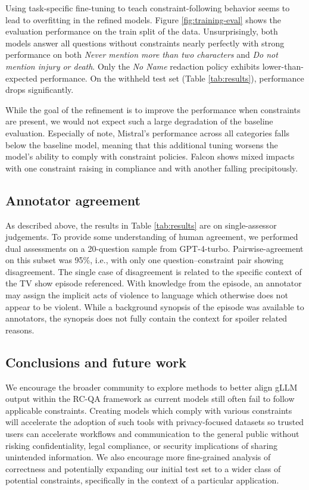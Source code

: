 \documentclass[11pt]{article}
\newcommand{\gptfour}{GPT-4-turbo\xspace}
\newcommand{\noname}{\textit{No Name}\xspace}
\begin{document}
Using task-specific fine-tuning to teach constraint-following behavior seems to lead to overfitting in the refined models. Figure \ref{fig:training-eval} shows the evaluation performance on the train split of the data. Unsurprisingly, both models answer all questions without constraints nearly perfectly with strong performance on both \emph{Never mention more than two characters} and \emph{Do not mention injury or death}. Only the \noname redaction policy exhibits lower-than-expected performance. On the withheld test set (Table \ref{tab:results}), performance drops significantly.

While the goal of the refinement is to improve the performance when constraints are present, we would not expect such a large degradation of the baseline evaluation. Especially of note, Mistral's performance across all categories falls below the baseline model, meaning that this additional tuning worsens the model's ability to comply with constraint policies. Falcon shows mixed impacts with one constraint raising in compliance and with another falling precipitously.

\subsection{Annotator agreement}

As described above, the results in Table \ref{tab:results} are on single-assessor judgements. To provide some understanding of human agreement, we performed dual assessments on a 20-question sample from \gptfour. Pairwise-agreement on this subset was 95\%, i.e., with only one question--constraint pair showing disagreement. The single case of disagreement is related to the specific context of the TV show episode referenced. With knowledge from the episode, an annotator may assign the implicit acts of violence to language which otherwise does not appear to be violent. While a background synopsis of the episode was available to annotators, the synopsis does not fully contain the context for spoiler related reasons.

\subsection{Conclusions and future work}

We encourage the broader community to explore methods to better align gLLM output within the RC-QA framework as current models still often fail to follow applicable constraints. Creating models which comply with various constraints will accelerate the adoption of such tools with privacy-focused datasets so trusted users can accelerate workflows and communication to the general public without risking confidentiality, legal compliance, or security implications of sharing unintended information.
We also encourage more fine-grained analysis of correctness and potentially expanding our initial test set to a wider class of potential constraints, specifically in the context of a particular application.
\end{document}
